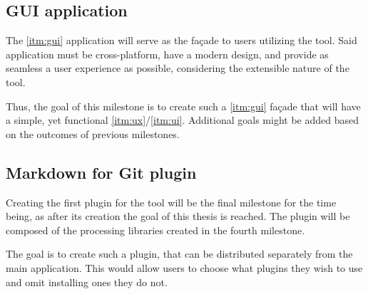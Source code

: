 \subsection*{GUI application} \label{subSecGuiApp}

The \ref{itm:gui} application will serve as the façade to users utilizing the tool. Said application must be cross-platform, have a modern design, and provide as seamless a user experience as possible, considering the extensible nature of the tool.

Thus, the goal of this milestone is to create such a \ref{itm:gui} façade that will have a simple, yet functional \ref{itm:ux}/\ref{itm:ui}. Additional goals might be added based on the outcomes of previous milestones.

\subsection*{Markdown for Git plugin} \label{subSecMdGitPlugin}

Creating the first plugin for the tool will be the final milestone for the time being, as after its creation the goal of this thesis is reached.
The plugin will be composed of the processing libraries created in the fourth milestone.

The goal is to create such a plugin, that can be distributed separately from the main application. This would allow users to choose what plugins they wish to use and omit installing ones they do not.
